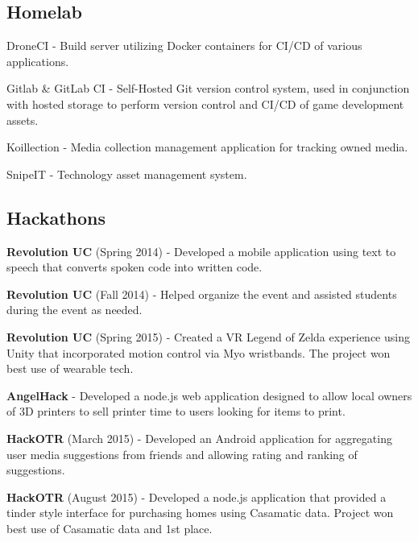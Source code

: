 \subsection{{Homelab \hfill}}
\begin{zitemize}
\item DroneCI - Build server utilizing Docker containers for CI/CD of various applications.
\item Gitlab & GitLab CI - Self-Hosted Git version control system, used in conjunction with hosted storage to perform version control and CI/CD of game development assets.
\item Koillection - Media collection management application for tracking owned media.
\item SnipeIT - Technology asset management system.
\end{zitemize}

\subsection{{Hackathons \hfill}}
\begin{zitemize}
\item \textbf{Revolution UC} (Spring 2014) - Developed a mobile application using text to speech that converts spoken code into written code.
\item \textbf{Revolution UC} (Fall 2014) - Helped organize the event and assisted students during the event as needed.
\item \textbf{Revolution UC} (Spring 2015) - Created a VR Legend of Zelda experience using Unity that incorporated motion control via Myo wristbands. The project won best use of wearable tech.
\item \textbf{AngelHack} - Developed a node.js web application designed to allow local owners of 3D printers to sell printer time to users looking for items to print.
\item \textbf{HackOTR} (March 2015) - Developed an Android application for aggregating user media suggestions from friends and allowing rating and ranking of suggestions.
\item \textbf{HackOTR} (August 2015) - Developed a node.js application that provided a tinder style interface for purchasing homes using Casamatic data. Project won best use of Casamatic data and 1st place.
\end{zitemize}


